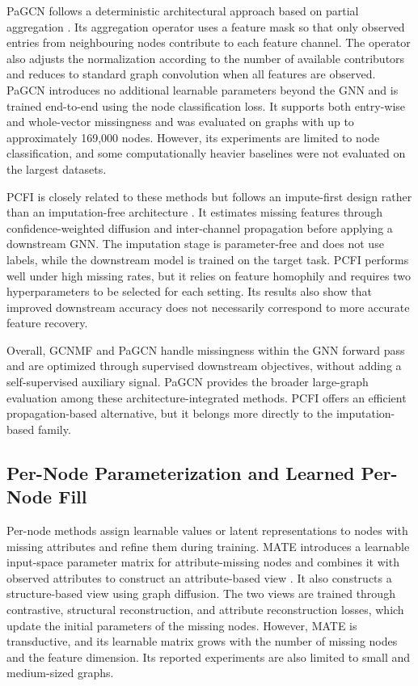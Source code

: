 PaGCN follows a deterministic architectural approach based on partial aggregation \cite{zhang2024incomplete}. Its aggregation operator uses a feature mask so that only observed entries from neighbouring nodes contribute to each feature channel. The operator also adjusts the normalization according to the number of available contributors and reduces to standard graph convolution when all features are observed. PaGCN introduces no additional learnable parameters beyond the GNN and is trained end-to-end using the node classification loss. It supports both entry-wise and whole-vector missingness and was evaluated on graphs with up to approximately 169,000 nodes. However, its experiments are limited to node classification, and some computationally heavier baselines were not evaluated on the largest datasets.

PCFI is closely related to these methods but follows an impute-first design rather than an imputation-free architecture \cite{um2023confidence}. It estimates missing features through confidence-weighted diffusion and inter-channel propagation before applying a downstream GNN. The imputation stage is parameter-free and does not use labels, while the downstream model is trained on the target task. PCFI performs well under high missing rates, but it relies on feature homophily and requires two hyperparameters to be selected for each setting. Its results also show that improved downstream accuracy does not necessarily correspond to more accurate feature recovery.

Overall, GCNMF and PaGCN handle missingness within the GNN forward pass and are optimized through supervised downstream objectives, without adding a self-supervised auxiliary signal. PaGCN provides the broader large-graph evaluation among these architecture-integrated methods. PCFI offers an efficient propagation-based alternative, but it belongs more directly to the imputation-based family.

\subsection{Per-Node Parameterization and Learned Per-Node Fill}

Per-node methods assign learnable values or latent representations to nodes with missing attributes and refine them during training. MATE introduces a learnable input-space parameter matrix for attribute-missing nodes and combines it with observed attributes to construct an attribute-based view \cite{peng2024multi}. It also constructs a structure-based view using graph diffusion. The two views are trained through contrastive, structural reconstruction, and attribute reconstruction losses, which update the initial parameters of the missing nodes. However, MATE is transductive, and its learnable matrix grows with the number of missing nodes and the feature dimension. Its reported experiments are also limited to small and medium-sized graphs.

